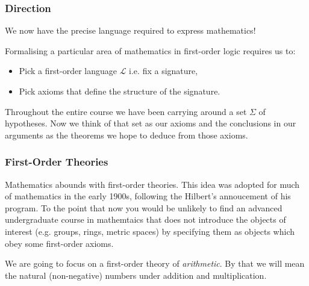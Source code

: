 \documentclass{beamer}
\theoremstyle{indentDefn} \newtheorem{defn}[]{Definition}
\begin{document}
	
	

\begin{frame}
  \frametitle{Direction}

	We now have the precise language required to express mathematics!
	
	\vspace{5mm}
	
	Formalising a particular area of mathematics in first-order logic requires us to:
	
	\begin{itemize}
		\item Pick a first-order language $\mathcal{L}$ i.e. fix a signature,
		\item Pick axioms that define the structure of the signature. 
	\end{itemize}
	
	Throughout the entire course we have been carrying around a set $\Sigma$ of hypotheses. Now we think of that set as our axioms and the conclusions in our arguments as the theorems we hope to deduce from those axioms. 
\end{frame}

\begin{frame}
	\frametitle{First-Order Theories}
	
	Mathematics abounds with first-order theories. This idea was adopted for much of mathematics in the early 1900s, following the Hilbert's annoucement of his program. To the point that now you would be unlikely to find an advanced undergraduate course in mathemtaics that does not introduce the objects of interest (e.g. groups, rings, metric spaces) by specifying them as objects which obey some first-order axioms. 
	
	\vspace{0.2cm}
	
	We are going to focus on a first-order theory of \textit{arithmetic}. By that we will mean the natural (non-negative) numbers under addition and multiplication.

\end{frame}
\end{document}

